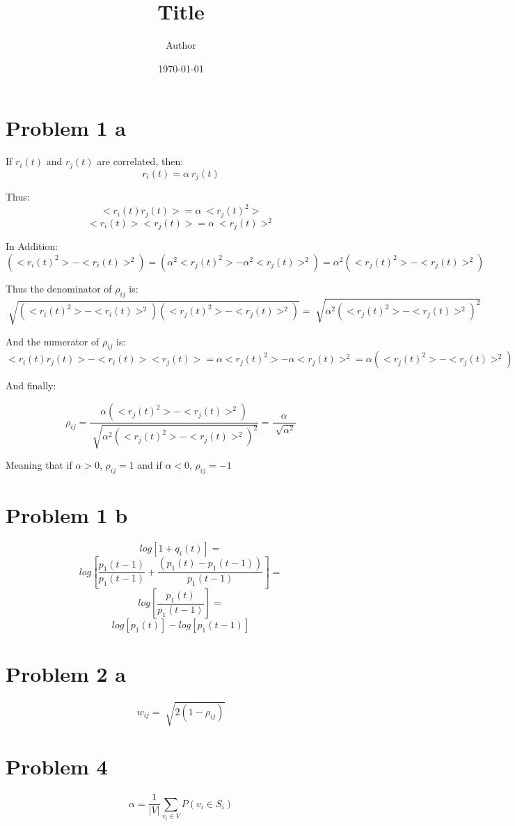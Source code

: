 \documentclass[11pt]{article}
\title{ Title}
\author{ Author }
\date{\today}
\begin{document}

\section{Problem 1 a}

If \(r_i(t)\) and \(r_j(t)\) are correlated, then: 
$$r_i(t) = \alpha \: r_j(t)$$

Thus:
$$<r_i(t)r_j(t)>= \alpha \: <r_j(t)^2>$$
$$<r_i(t)><r_j(t)>= \alpha \: <r_j(t)>^2$$

In Addition:
$$(<r_i(t)^2> - <r_i(t)>^2) = (\alpha^2 <r_j(t)^2> - \alpha^2<r_j(t)>^2) = \alpha^2 (<r_j(t)^2> - <r_j(t)>^2)$$

Thus the denominator of \(\rho_{ij}\) is:
$$\sqrt[]{(<r_i(t)^2> - <r_i(t)>^2)(<r_j(t)^2> - <r_j(t)>^2)} = \sqrt[]{\alpha^2 (<r_j(t)^2> - <r_j(t)>^2)^2}$$

And the numerator of \(\rho_{ij}\) is:
$$<r_i(t)r_j(t)> - <r_i(t)><r_j(t)> = \alpha <r_j(t)^2> - \alpha <r_j(t)>^2 = \alpha (<r_j(t)^2> - <r_j(t)>^2)$$

And finally:

$$\rho_{ij} =\frac{\alpha (<r_j(t)^2> - <r_j(t)>^2)}{\sqrt[]{\alpha^2 (<r_j(t)^2> - <r_j(t)>^2)^2}} = \frac{\alpha}{\sqrt[]{\alpha^2}}$$

\begin{center}Meaning that if \(\alpha > 0\), \(\rho_{ij} = 1\) and if \(\alpha < 0\), \(\rho_{ij} = -1\) \end{center}

\section{Problem 1 b}

$$log[1+q_i(t)] =$$
$$log[\frac{p_1(t-1)}{p_1(t-1)} + \frac{(p_1(t)-p_1(t-1))}{p_1(t-1)}] =$$
$$log[\frac{p_1(t)}{p_1(t-1)}] =$$
$$log[p_1(t)] - log[p_1(t-1)]$$

\section{Problem 2 a}

$$w_{ij} = \sqrt[]{2(1-\rho_{ij})}$$

\newpage

\section{Problem 4}

$$\alpha = \frac{1}{|V|}\sum_{v_i\in V} P(v_i\in S_i)$$
\end{document}
